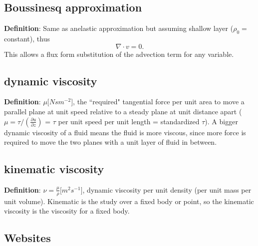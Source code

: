 \subsection{Boussinesq approximation}
{\bf Definition}: Same as anelastic approximation but assuming shallow layer ($\rho_0 = $ constant),
thus
\begin{equation}
   \nabla \cdot v = 0.
\end{equation}
This allows a flux form substitution of the advection term for any variable.


\subsection{dynamic viscosity}
{\bf Definition}: $\mu \big[ N s m^{-2}\big]$, the ``required" tangential force per unit area to
move a parallel plane at unit speed relative to a steady plane at unit distance apart
($\mu = \tau/(\frac{\partial u}{\partial z})$ = $\tau$ per unit speed per unit length = standardized
$\tau$). A bigger dynamic viscosity of a fluid means the fluid is more viscous, since more force is
required to move the two planes with a unit layer of fluid in between.

\subsection{kinematic viscosity}
{\bf Definition}: $\nu = \frac{\mu}{\rho} \big[ m^2 s^{-1}\big]$, dynamic viscosity per unit density
(per unit mass per unit volume). Kinematic is the study over a fixed body or point, so the kinematic
viscosity is the viscosity for a fixed body.


%
\subsection{Websites}


